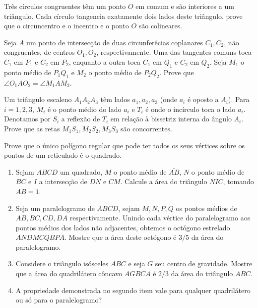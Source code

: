 \begin{questao}
  Três círculos congruentes têm um ponto $O$ em comum e
  são interiores a um triângulo. Cada círculo tangencia exatamente
  dois lados deste triângulo. prove que o circuncentro e o incentro e
  o ponto $O$ são colineares.
\end{questao}

\begin{questao}
  Seja $A$ um ponto de intersecção de duas circunferêcias
  coplanares $C_1,C_2$, não congruentes, de centros $O_1,O_2$,
  respectivamente. Uma das tangentes comuns toca $C_1$ em $P_1$ e
  $C_2$ em $P_2$, enquanto a outra toca $C_1$ em $Q_1$ e
  $C_2$ em $Q_2$. Seja $M_1$ o ponto médio de
  $\overbar{P_1Q_1}$ e $M_2$ o ponto médio de
  $\overbar{P_2Q_2}$. Prove que $\angle O_1AO_2 = \angle M_1AM_2$.
\end{questao}

\begin{questao}
  Um triângulo escaleno $A_1A_2A_3$ têm lados
  $a_1,a_2,a_3$ (onde $a_i$ é oposto a $A_i$). Para $i=1,2,3$,
  $M_i$ é o ponto médio do lado $a_i$ e $T_i$ é onde o incírculo
  toca o lado $a_i$. Denotamos por $S_i$ a reflexão de $T_i$ em
  relação à bissetriz interna do ângulo $A_i$. Prove que as retas
  $M_1S_1,M_2S_2,M_3S_3$ são concorrentes.
\end{questao}

\begin{questao}
  Prove que o único polígono regular que pode ter todos os
  seus vértices sobre os pontos de um reticulado é o quadrado.
\end{questao}

\begin{questao}

  \begin{enumerate}

    \item Sejam $ABCD$ um quadrado, $M$ o ponto médio de
    $\overbar{AB}$, $N$ o ponto médio de $BC$ e $I$ a
    intersecção de $DN$ e $CM$. Calcule a área do triângulo
    $NIC$, tomando $AB=1$.

    \item Seja um paralelogramo de $ABCD$, sejam $M,N,P,Q$ os pontos
    médios de $AB,BC,CD,DA$ respectivamente. Unindo cada vértice do
    paralelogramo aos pontos médios dos lados não adjacentes, obtemos
    o octógono estrelado $ANDMCQBPA$. Mostre que a área deste
    octógono é $3/5$ da área do paralelogramo.

    \item Considere o triângulo isósceles $ABC$ e seja $G$ seu
    centro de gravidade. Mostre que a área do quadrilátero côncavo
    $AGBCA$ é $2/3$ da área do triângulo $ABC$.

    \item A propriedade demonstrada no segundo item vale para qualquer
    quadrilátero ou só para o paralelogramo?
  \end{enumerate}
\end{questao}

